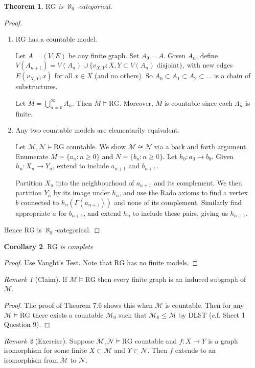 \documentclass[]{article}
\theoremstyle{custhm}
\newtheorem{theorem}{Theorem}[section]
\theoremstyle{cusdef}
\theoremstyle{custhm}
\theoremstyle{custhm}
\newtheorem{cor}[theorem]{Corollary}
\theoremstyle{custhm}
\theoremstyle{ex}
\theoremstyle{custhm}
\theoremstyle{cusdef}
\theoremstyle{remark}
\newtheorem*{remark*}{Remark}
\newcommand{\ra}{\rightarrow}
\renewcommand{\it}[1]{\textit{#1}}
\newcommand{\M}{\mathcal{M}}
\newcommand{\N}{\mathcal{N}}
\newcommand{\rg}{\textrm{RG}}
\begin{document}
\begin{theorem}
$\rg$ is $\aleph_0$-categorical.
\end{theorem}
\begin{proof}\ 
\begin{enumerate}[label=\arabic*)]
	\item $\rg$ has a countable model.
	
	Let $A = (V,E)$ be any finite graph. Set $A_0 = A$. Given $A_n$, define $V(A_{n+1}) = V(A_n)\cup\{v_{X,Y}:X,Y\subset V(A_n)\textrm{ disjoint}\}$, with new edges $E(v_{X,Y},x)$ for all $x\in X$ (and no others). So $A_0\subset A_1\subset A_2\subset\dots$ is a chain of substructures.
	
	Let $M = \bigcup_{n=0}^{\infty}A_n$. Then $M\models\rg$. Moreover, $M$ is countable since each $A_n$ is finite. 
	
	\item Any two countable models are elementarily equivalent.
	
	Let $\M,\N\models \rg$ countable. We show $\M\cong \N$ via a back and forth argument. Enumerate $M = \{a_n : n\ge 0\}$ and $N = \{b_n:n\ge 0\}$. Let $h_0: a_0\mapsto b_0$. Given $h_n:X_n\ra Y_n$, extend to include $a_{n+1}$ and $b_{n+1}$.
	
	Partition $X_n$ into the neighbourhood of $a_{n+1}$ and its complement. We then partition $Y_n$ by its image under $h_n$, and use the Rado axioms to find a vertex $b$ connected to $h_n(\Gamma(a_{n+1}))$ and none of its complement. Similarly find appropriate $a$ for $b_{n+1}$, and extend $h_n$ to include these pairs, giving us $h_{n+1}$.
\end{enumerate}
Hence $\rg$ is $\aleph_0$-categorical.
\end{proof}
\begin{cor}
$\rg$ is complete
\end{cor}
\begin{proof}
Use Vaught's Test. Note that $\rg$ has no finite models.
\end{proof}
\begin{remark*}[Claim]
If $\M\models \rg$ then every finite graph is an induced subgraph of $\M$.
\end{remark*}
\begin{proof}
The proof of Theorem 7.6 shows this when $\M$ is countable. Then for any $\M\models \rg$ there exists a countable $\M_0$ such that $\M_0\le \M$ by DLST ({\it c.f.} Sheet 1 Question 9).
\end{proof}
\begin{remark*}[Exercise]
	Suppose $\M,\N\models\rg$ countable and $f: X\ra Y$ is a graph isomorphism for some finite $X\subset \M$ and $Y\subset \N$. Then $f$ extends to an isomorphism from $\M$ to $\N$.
\end{remark*}
\end{document}
